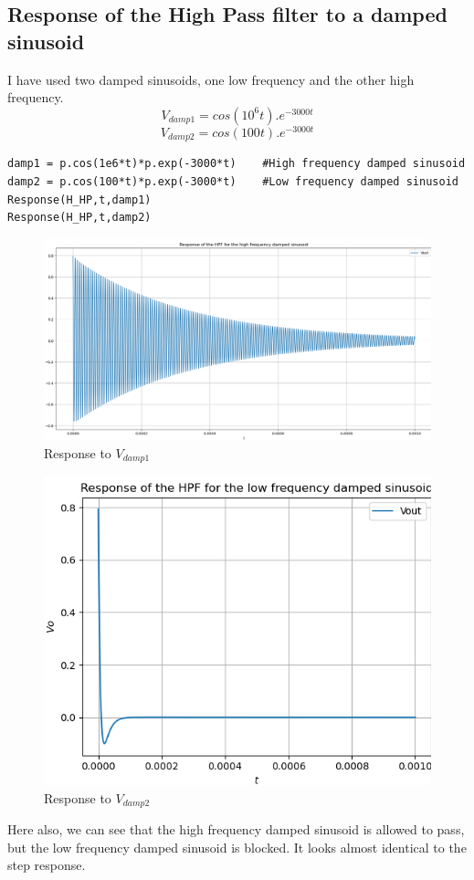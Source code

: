 \documentclass[11pt, a4paper]{article}
\begin{document}
\subsection{Response of the High Pass filter to a damped sinusoid}
    I have used two damped sinusoids, one low frequency and the other high frequency.
    \begin{equation*}
        V_{damp1} = cos(10^6t).e^{-3000t}
    \end{equation*}
    \begin{equation*}
        V_{damp2} = cos(100t).e^{-3000t}
    \end{equation*}
    \begin{verbatim}
damp1 = p.cos(1e6*t)*p.exp(-3000*t)    #High frequency damped sinusoid       
damp2 = p.cos(100*t)*p.exp(-3000*t)    #Low frequency damped sinusoid
Response(H_HP,t,damp1)
Response(H_HP,t,damp2)
    \end{verbatim}
    \begin{figure}[!h]
        \centering
        \includegraphics[scale = 0.43]{Figure 7.png}
        \caption{Response to $V_{damp1}$}
        \label{fig:Figure 7}
    \end{figure}
    \begin{figure}[!h]
        \centering
        \includegraphics[scale = 0.65]{Figure 8.png}
        \caption{Response to $V_{damp2}$}
        \label{fig:Figure 8}
    \end{figure}
    Here also, we can see that the high frequency damped sinusoid is allowed to pass, but the low frequency damped sinusoid is blocked. It looks almost identical to the step response.
\end{document}
